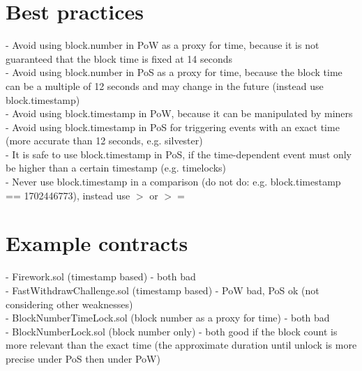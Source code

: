 \section{Best practices}
- Avoid using block.number in PoW as a proxy for time, because it is not guaranteed that the block time is fixed at 14 seconds \\
- Avoid using block.number in PoS as a proxy for time, because the block time can be a multiple of 12 seconds and may change in the future (instead use block.timestamp)\\
- Avoid using block.timestamp in PoW, because it can be manipulated by miners \\
- Avoid using block.timestamp in PoS for triggering events with an exact time (more accurate than 12 seconds, e.g. silvester) \\
- It is safe to use block.timestamp in PoS, if the time-dependent event must only be higher than a certain timestamp (e.g. timelocks) \\
- Never use block.timestamp in a comparison (do not do: e.g. block.timestamp == 1702446773), instead use $>$ or $>=$

\section{Example contracts}
- Firework.sol (timestamp based) - both bad \\
- FastWithdrawChallenge.sol (timestamp based) - PoW bad, PoS ok (not considering other weaknesses) \\
- BlockNumberTimeLock.sol (block number as a proxy for time) - both bad \\
- BlockNumberLock.sol (block number only) - both good if the block count is more relevant than the exact time
(the approximate duration until unlock is more precise under PoS then under PoW) \\